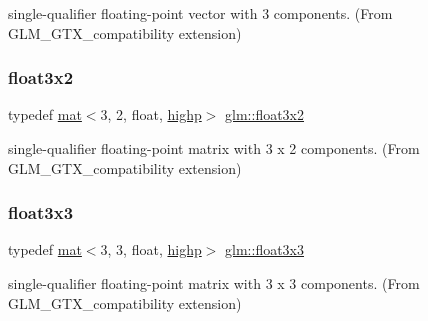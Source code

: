 single-\/qualifier floating-\/point vector with 3 components. (From G\+L\+M\+\_\+\+G\+T\+X\+\_\+compatibility extension) 

\mbox{\label{group__gtx__compatibility_ga8e7b0c3f63f470d7a7913453194b0c99}} 
\subsubsection{\texorpdfstring{float3x2}{float3x2}}
{\footnotesize\ttfamily typedef \mbox{\hyperlink{structglm_1_1mat}{mat}}$<$3, 2, float, \mbox{\hyperlink{namespaceglm_a36ed105b07c7746804d7fdc7cc90ff25ac6f7eab42eacbb10d59a58e95e362074}{highp}}$>$ \mbox{\hyperlink{group__gtx__compatibility_ga8e7b0c3f63f470d7a7913453194b0c99}{glm\+::float3x2}}}



single-\/qualifier floating-\/point matrix with 3 x 2 components. (From G\+L\+M\+\_\+\+G\+T\+X\+\_\+compatibility extension) 

\mbox{\label{group__gtx__compatibility_ga0c6bbdaa1ebe76fbb55a77d5ca0e2846}} 
\subsubsection{\texorpdfstring{float3x3}{float3x3}}
{\footnotesize\ttfamily typedef \mbox{\hyperlink{structglm_1_1mat}{mat}}$<$3, 3, float, \mbox{\hyperlink{namespaceglm_a36ed105b07c7746804d7fdc7cc90ff25ac6f7eab42eacbb10d59a58e95e362074}{highp}}$>$ \mbox{\hyperlink{group__gtx__compatibility_ga0c6bbdaa1ebe76fbb55a77d5ca0e2846}{glm\+::float3x3}}}



single-\/qualifier floating-\/point matrix with 3 x 3 components. (From G\+L\+M\+\_\+\+G\+T\+X\+\_\+compatibility extension) 

\mbox{\label{group__gtx__compatibility_ga53ae5a5af5943b6557eda4a6502e4484}} 
